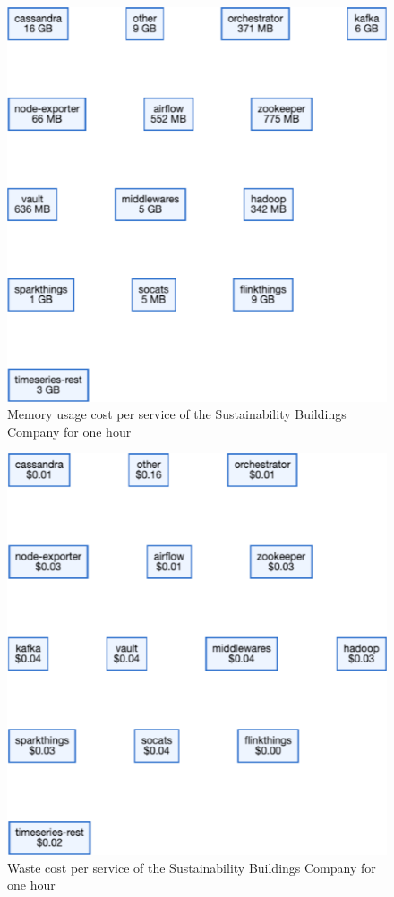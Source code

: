 \begin{figure}
    \centering
    \includegraphics[width=\textwidth]{gfx/sb-cost-mem.png}
    \caption{Memory usage cost per service of the Sustainability Buildings Company for one hour}
    \label{fig:sb-cost-mem}
\end{figure}

\begin{figure}
    \centering
    \includegraphics[width=\textwidth]{gfx/sb-waste.png}
    \caption{Waste cost per service of the Sustainability Buildings Company for one hour}
    \label{fig:sb-waste}
\end{figure}

